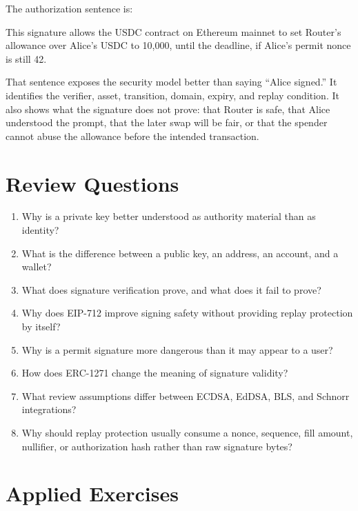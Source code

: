 The authorization sentence is:

\begin{codeblock}
This signature allows the USDC contract on Ethereum mainnet
to set Router's allowance over Alice's USDC to 10,000,
until the deadline,
if Alice's permit nonce is still 42.
\end{codeblock}

That sentence exposes the security model better than saying ``Alice signed.'' It identifies the verifier, asset, transition, domain, expiry, and replay condition. It also shows what the signature does not prove: that Router is safe, that Alice understood the prompt, that the later swap will be fair, or that the spender cannot abuse the allowance before the intended transaction.

\section*{Review Questions}

\begin{enumerate}
\item Why is a private key better understood as authority material than as identity?
\item What is the difference between a public key, an address, an account, and a wallet?
\item What does signature verification prove, and what does it fail to prove?
\item Why does EIP-712 improve signing safety without providing replay protection by itself?
\item Why is a permit signature more dangerous than it may appear to a user?
\item How does ERC-1271 change the meaning of signature validity?
\item What review assumptions differ between ECDSA, EdDSA, BLS, and Schnorr integrations?
\item Why should replay protection usually consume a nonce, sequence, fill amount, nullifier, or authorization hash rather than raw signature bytes?
\end{enumerate}

\section*{Applied Exercises}

